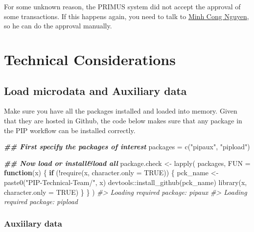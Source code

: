 \documentclass[
]{book}
\newenvironment{Shaded}{\begin{snugshade}}{\end{snugshade}}
\newcommand{\AttributeTok}[1]{\textcolor[rgb]{0.77,0.63,0.00}{#1}}
\newcommand{\CommentTok}[1]{\textcolor[rgb]{0.56,0.35,0.01}{\textit{#1}}}
\newcommand{\ConstantTok}[1]{\textcolor[rgb]{0.00,0.00,0.00}{#1}}
\newcommand{\ControlFlowTok}[1]{\textcolor[rgb]{0.13,0.29,0.53}{\textbf{#1}}}
\newcommand{\DocumentationTok}[1]{\textcolor[rgb]{0.56,0.35,0.01}{\textbf{\textit{#1}}}}
\newcommand{\FunctionTok}[1]{\textcolor[rgb]{0.00,0.00,0.00}{#1}}
\newcommand{\NormalTok}[1]{#1}
\newcommand{\OtherTok}[1]{\textcolor[rgb]{0.56,0.35,0.01}{#1}}
\newcommand{\SpecialCharTok}[1]{\textcolor[rgb]{0.00,0.00,0.00}{#1}}
\newcommand{\StringTok}[1]{\textcolor[rgb]{0.31,0.60,0.02}{#1}}
\begin{document}
For some unknown reason, the PRIMUS system did not accept the approval of some
transactions. If this happens again, you need to talk to \href{mailto:mnguyen3@worldbank.org}{Minh Cong
Nguyen}, so he can do the approval manually.

\hypertarget{part-technical-considerations}{%
\part{Technical Considerations}\label{part-technical-considerations}}

\hypertarget{load}{%
\chapter{Load microdata and Auxiliary data}\label{load}}

Make sure you have all the packages installed and loaded into memory. Given that they are hosted in Github, the code below makes sure that any package in the PIP workflow can be installed correctly.

\begin{Shaded}
\begin{Highlighting}[]
\DocumentationTok{\#\# First specify the packages of interest}
\NormalTok{packages }\OtherTok{=} \FunctionTok{c}\NormalTok{(}\StringTok{"pipaux"}\NormalTok{, }\StringTok{"pipload"}\NormalTok{)}

\DocumentationTok{\#\# Now load or install\&load all}
\NormalTok{package.check }\OtherTok{\textless{}{-}} \FunctionTok{lapply}\NormalTok{(}
\NormalTok{  packages,}
  \AttributeTok{FUN =} \ControlFlowTok{function}\NormalTok{(x) \{}
    \ControlFlowTok{if}\NormalTok{ (}\SpecialCharTok{!}\FunctionTok{require}\NormalTok{(x, }\AttributeTok{character.only =} \ConstantTok{TRUE}\NormalTok{)) \{}
\NormalTok{      pck\_name }\OtherTok{\textless{}{-}} \FunctionTok{paste0}\NormalTok{(}\StringTok{"PIP{-}Technical{-}Team/"}\NormalTok{, x)}
\NormalTok{      devtools}\SpecialCharTok{::}\FunctionTok{install\_github}\NormalTok{(pck\_name)}
      \FunctionTok{library}\NormalTok{(x, }\AttributeTok{character.only =} \ConstantTok{TRUE}\NormalTok{)}
\NormalTok{    \}}
\NormalTok{  \}}
\NormalTok{)}
\CommentTok{\#\textgreater{} Loading required package: pipaux}
\CommentTok{\#\textgreater{} Loading required package: pipload}
\end{Highlighting}
\end{Shaded}

\hypertarget{auxiilary-data}{%
\section{Auxiilary data}\label{auxiilary-data}}
\end{document}
